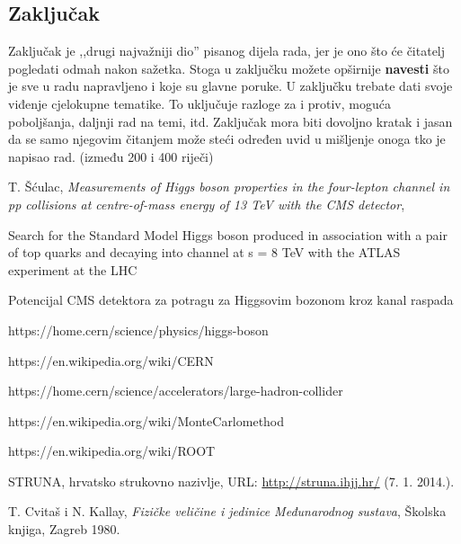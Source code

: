\documentclass[12pt,a4paper,oneside]{article}
\begin{document}
\begin{linenumbers}
		\newpage
		\section{Zaključak}
		Zaključak je ,,drugi najvažniji dio'' pisanog dijela rada, jer je ono što će čitatelj pogledati odmah nakon sažetka. Stoga u zaključku možete opširnije \textbf{navesti} što je sve u radu napravljeno i koje su glavne poruke. U zaključku trebate dati svoje viđenje cjelokupne tematike. To uključuje razloge za i protiv, moguća poboljšanja, daljnji rad na temi, itd. Zaključak mora biti dovoljno kratak i jasan da se samo njegovim čitanjem može steći određen uvid u mišljenje onoga tko je napisao rad. (između 200 i 400 riječi)
		
		
		\newpage
		{\raggedright
			\begin{thebibliography}{99}
				T. Šćulac, \textit{Measurements of Higgs boson properties
					in the four-lepton channel in pp collisions
					at centre-of-mass energy of 13 TeV with
					the CMS detector}, 
				
				Search for the Standard Model Higgs boson produced in
				association with a pair of top quarks and decaying into
				channel at s = 8 TeV
				with the ATLAS experiment at the LHC
				
				Potencijal CMS detektora za
				potragu za Higgsovim bozonom kroz
				kanal raspada
				
				https://home.cern/science/physics/higgs-boson
				
				https://en.wikipedia.org/wiki/CERN
				
				https://home.cern/science/accelerators/large-hadron-collider
				
				
				https://en.wikipedia.org/wiki/Monte\textunderscore Carlo\textunderscore method
				
				https://en.wikipedia.org/wiki/ROOT
				
				STRUNA, hrvatsko strukovno nazivlje,  URL: \url{http://struna.ihjj.hr/} (7. 1. 2014.).
				
				T. Cvitaš i N. Kallay, \textit{Fizičke veličine i jedinice Međunarodnog sustava}, Školska knjiga, Zagreb 1980.
				

\end{thebibliography}}
\end{linenumbers}
\end{document}

